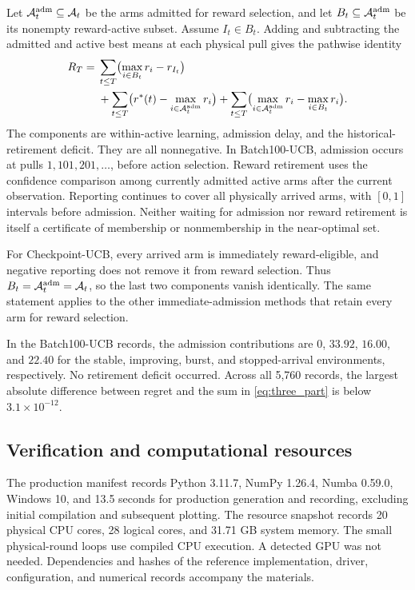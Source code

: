 \documentclass[11pt]{article}
\theoremstyle{remark}
\begin{document}
Let $\mathcal A_t^{\rm adm}\subseteq\mathcal A_t$ be the arms admitted
for reward selection, and let $B_t\subseteq\mathcal A_t^{\rm adm}$ be
its nonempty reward-active subset. Assume $I_t\in B_t$. Adding and
subtracting the admitted and active best means at each physical pull gives
the pathwise identity
\begin{equation}
\begin{aligned}
R_T={}&\sum_{t\le T}\bigl(\max_{i\in B_t}r_i-r_{I_t}\bigr)\\
&+\sum_{t\le T}\bigl(r^*(t)-\max_{i\in\mathcal A_t^{\rm adm}}r_i\bigr)
+\sum_{t\le T}\bigl(\max_{i\in\mathcal A_t^{\rm adm}}r_i
                         -\max_{i\in B_t}r_i\bigr).
\end{aligned}
\label{eq:three_part}
\end{equation}
The components are within-active learning, admission delay, and the
historical-retirement deficit. They are all nonnegative. In Batch100-UCB,
admission occurs at pulls $1,101,201,\ldots$, before action selection.
Reward retirement uses the confidence comparison among currently
admitted active arms after the current observation. Reporting continues
to cover all physically arrived arms, with $[0,1]$ intervals before
admission. Neither waiting for admission nor reward retirement is itself
a certificate of membership or nonmembership in the near-optimal set.

For Checkpoint-UCB, every arrived arm is immediately reward-eligible,
and negative reporting does not remove it from reward selection.
Thus $B_t=\mathcal A_t^{\rm adm}=\mathcal A_t$, so the last two
components vanish identically. The same statement applies to the other
immediate-admission methods that retain every arm for reward selection.

In the Batch100-UCB records, the admission contributions are $0$, $33.92$,
$16.00$, and $22.40$ for the stable, improving, burst, and stopped-arrival
environments, respectively. No retirement deficit occurred. Across all
5,760 records, the largest absolute difference between regret and the
sum in \eqref{eq:three_part} is below $3.1\times10^{-12}$.

\subsection{Verification and computational resources}

The production manifest records Python 3.11.7, NumPy 1.26.4, Numba 0.59.0,
Windows 10, and 13.5 seconds for production generation and recording,
excluding initial compilation and subsequent plotting. The resource snapshot records
20 physical CPU cores, 28 logical cores, and 31.71 GB system memory.
The small physical-round loops use compiled CPU execution. A detected GPU
was not needed. Dependencies and hashes of the reference implementation,
driver, configuration, and numerical records accompany the materials.
\end{document}
